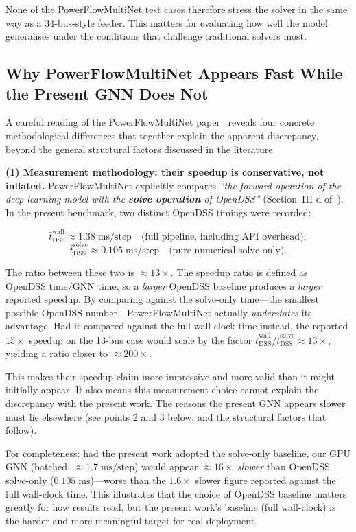 \documentclass[11pt]{article}
\begin{document}
None of the PowerFlowMultiNet test cases therefore stress the solver
in the same way as a 34-bus-style feeder.  This matters for evaluating
how well the model generalises under the conditions that challenge
traditional solvers most.

\subsection{Why PowerFlowMultiNet Appears Fast While the Present GNN Does Not}

A careful reading of the PowerFlowMultiNet paper~\cite{Ghamizi2024} reveals
four concrete methodological differences that together explain the apparent
discrepancy, beyond the general structural factors discussed in the literature.

\textbf{(1) Measurement methodology: their speedup is conservative, not inflated.}
PowerFlowMultiNet explicitly compares
\emph{``the forward operation of the deep learning model with the
\textbf{solve operation} of OpenDSS''} (Section~III-d of~\cite{Ghamizi2024}).
In the present benchmark, two distinct OpenDSS timings were recorded:

\[
\bar{t}^{\text{wall}}_{\text{DSS}} \approx 1.38\;\text{ms/step}
\quad\text{(full pipeline, including API overhead)},
\]
\[
\bar{t}^{\text{solve}}_{\text{DSS}} \approx 0.105\;\text{ms/step}
\quad\text{(pure numerical solve only)}.
\]

The ratio between these two is ${\approx}13\times$.
The speedup ratio is defined as $\text{OpenDSS time} / \text{GNN time}$,
so a \emph{larger} OpenDSS baseline produces a \emph{larger} reported speedup.
By comparing against the solve-only time---the smallest possible OpenDSS
number---PowerFlowMultiNet actually \emph{understates} its advantage.
Had it compared against the full wall-clock time instead, the reported
$15\times$ speedup on the 13-bus case would scale by the factor
$\bar{t}^{\text{wall}}_{\text{DSS}} / \bar{t}^{\text{solve}}_{\text{DSS}}
\approx 13\times$, yielding a ratio closer to ${\approx}200\times$.

This makes their speedup claim more impressive and more valid than it
might initially appear.  It also means this measurement choice cannot
explain the discrepancy with the present work.  The reasons the present
GNN appears slower must lie elsewhere (see points 2 and 3 below, and the
structural factors that follow).

For completeness: had the present work adopted the solve-only baseline,
our GPU GNN (batched, ${\approx}1.7\;\text{ms/step}$) would appear
${\approx}16\times$ \emph{slower} than OpenDSS solve-only
($0.105\;\text{ms}$)---worse than the $1.6\times$ slower figure reported
against the full wall-clock time.  This illustrates that the choice of
OpenDSS baseline matters greatly for how results read, but the present
work's baseline (full wall-clock) is the harder and more meaningful target
for real deployment.
\end{document}
